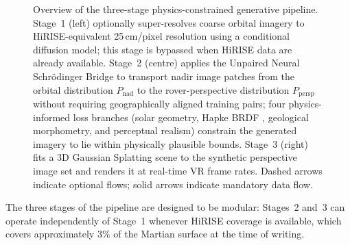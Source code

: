 \documentclass[10pt,journal]{IEEEtran}
\begin{document}
\begin{figure}[!t]
  \centering
  \caption{Overview of the three-stage physics-constrained generative pipeline.
  Stage~1 (left) optionally super-resolves coarse orbital imagery to
  HiRISE-equivalent 25\,cm/pixel resolution using a conditional diffusion model;
  this stage is bypassed when HiRISE data are already available. Stage~2 (centre)
  applies the Unpaired Neural Schr\"{o}dinger Bridge \cite{kim2024unsb} to
  transport nadir image patches from the orbital distribution
  $P_{\mathrm{nad}}$ to the rover-perspective distribution $P_{\mathrm{persp}}$
  without requiring geographically aligned training pairs; four physics-informed
  loss branches (solar geometry, Hapke BRDF \cite{hapke2012theory}, geological
  morphometry, and perceptual realism) constrain the generated imagery to lie
  within physically plausible bounds. Stage~3 (right) fits a 3D Gaussian
  Splatting scene \cite{kerbl2023gaussian} to the synthetic perspective image
  set and renders it at real-time VR frame rates. Dashed arrows indicate optional
  flows; solid arrows indicate mandatory data flow.}
  \label{fig:pipeline}
\end{figure}

The three stages of the pipeline are designed to be modular: Stages~2 and~3 can
operate independently of Stage~1 whenever HiRISE coverage is available, which
covers approximately 3\% of the Martian surface at the time of writing.
\end{document}
